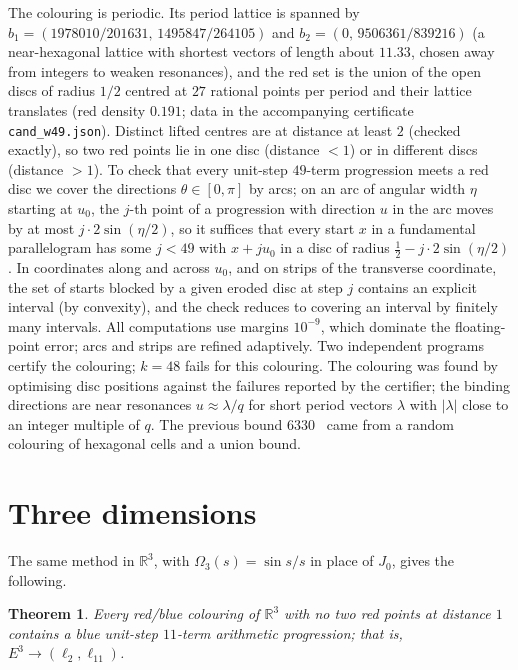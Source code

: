 \documentclass[11pt]{amsart}
\newtheorem{theorem}{Theorem}[section]
\theoremstyle{definition}
\newcommand{\R}{\mathbb{R}}
\begin{document}
The colouring is periodic. Its period lattice is spanned by $b_1=(1978010/201631,\,1495847/264105)$ and $b_2=(0,\,9506361/839216)$ (a near-hexagonal lattice with shortest vectors of length about $11.33$, chosen away from integers to weaken resonances), and the red set is the union of the open discs of radius $1/2$ centred at $27$ rational points per period and their lattice translates (red density $0.191$; data in the accompanying certificate \texttt{cand\_w49.json}). Distinct lifted centres are at distance at least $2$ (checked exactly), so two red points lie in one disc (distance $<1$) or in different discs (distance $>1$). To check that every unit-step $49$-term progression meets a red disc we cover the directions $\theta\in[0,\pi]$ by arcs; on an arc of angular width $\eta$ starting at $u_0$, the $j$-th point of a progression with direction $u$ in the arc moves by at most $j\cdot2\sin(\eta/2)$, so it suffices that every start $x$ in a fundamental parallelogram has some $j<49$ with $x+ju_0$ in a disc of radius $\tfrac12-j\cdot2\sin(\eta/2)$. In coordinates along and across $u_0$, and on strips of the transverse coordinate, the set of starts blocked by a given eroded disc at step $j$ contains an explicit interval (by convexity), and the check reduces to covering an interval by finitely many intervals. All computations use margins $10^{-9}$, which dominate the floating-point error; arcs and strips are refined adaptively. Two independent programs certify the colouring; $k=48$ fails for this colouring. The colouring was found by optimising disc positions against the failures reported by the certifier; the binding directions are near resonances $u\approx\lambda/q$ for short period vectors $\lambda$ with $|\lambda|$ close to an integer multiple of $q$. The previous bound $6330$~\cite{CMXZ} came from a random colouring of hexagonal cells and a union bound.

\section{Three dimensions}\label{sec:R3}

The same method in $\R^3$, with $\Omega_3(s)=\sin s/s$ in place of $J_0$, gives the following.

\begin{theorem}\label{thm:188R3}
Every red/blue colouring of $\R^3$ with no two red points at distance $1$ contains a blue unit-step $11$-term arithmetic progression; that is, $E^3\to(\ell_2,\ell_{11})$.
\end{theorem}
\end{document}
